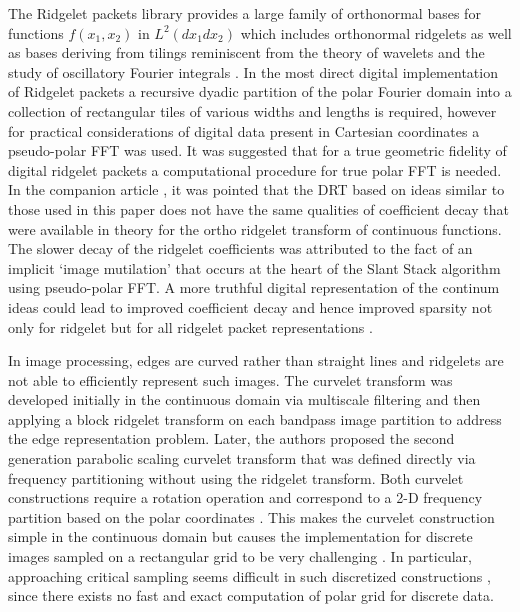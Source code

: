 \documentclass{UCF_ETD}
\begin{document}
The Ridgelet packets library provides a large family of orthonormal bases for functions $f(x_1,x_2)$ in $L^2(dx_1dx_2)$ which includes orthonormal ridgelets as well as bases deriving from tilings reminiscent from the theory of wavelets and the study of oscillatory Fourier integrals \cite{Flesia2003}. In the most direct digital implementation of Ridgelet packets a recursive dyadic partition of the polar Fourier domain into a collection of rectangular tiles of various widths and lengths is required, however for practical considerations of digital data present in Cartesian coordinates a pseudo-polar FFT \cite{Amir2001} was used. It was suggested that for a true geometric fidelity of digital ridgelet packets a computational procedure for true polar FFT is needed. In the companion article \cite{Donoho2003}, it was pointed that the DRT based on ideas similar to those used in this paper does not have the same qualities of coefficient decay that were available in theory for the ortho ridgelet transform of continuous functions. The slower decay of the ridgelet coefficients was attributed to the fact of an implicit `image mutilation' that occurs at the heart of the Slant Stack algorithm \cite{Amir2001} using pseudo-polar FFT. A more truthful digital representation of the continum ideas could lead to improved coefficient decay and hence improved sparsity not only for ridgelet but for all ridgelet packet representations \cite{Flesia2003}. 

In image processing, edges are curved rather than straight lines and ridgelets are not able to efficiently represent such images. The curvelet transform was developed initially in the continuous domain \cite{Candes1999} via multiscale filtering and then applying a block ridgelet transform \cite{CandesRoyal1999} on each bandpass image partition to address the edge representation problem. Later, the authors proposed the second generation parabolic scaling curvelet transform \cite{Candes2004} that was defined directly via frequency partitioning without using the ridgelet transform. Both curvelet constructions require a rotation operation and correspond to a 2-D frequency partition based on the polar coordinates \cite{Fadili2012}. This makes the curvelet construction simple in the continuous domain but causes the implementation for discrete images sampled on a rectangular grid to be very challenging \cite{Minh2005}. In particular, approaching critical sampling seems difficult in such discretized constructions \cite{Minh2005}, since there exists no fast and exact computation of polar grid for discrete data. 
 
\end{document}
